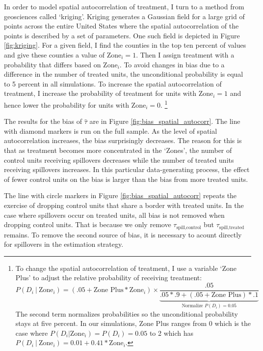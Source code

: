 \documentclass[11pt]{article}
\begin{document}
In order to model spatial autocorrelation of treatment, I turn to a method from geosciences called `kriging'. Kriging generates a Gaussian field for a large grid of points across the entire United States where the spatial autocorrelation of the points is described by a set of parameters. One such field is depicted in Figure \ref{fig:kriging}. For a given field, I find the counties in the top ten percent of values and give these counties a value of $\text{Zone}_i = 1$. Then I assign treatment with a probability that differs based on $\text{Zone}_i$. To avoid changes in bias due to a difference in the number of treated units, the unconditional probability is equal to 5 percent in all simulations. To increase the spatial autocorrelation of treatment, I increase the probability of treatment for units with $\text{Zone}_i = 1$ and hence lower the probability for units with $\text{Zone}_i = 0$. \footnote{
    To change the spatial autocorrelation of treatment, I use a variable `Zone Plus' to adjust the relative probability of receiving treatment: 
    \begin{equation}
        \label{eq:cond_prob}
        P(D_i \ \vert \ \text{Zone}_i) = (.05 + \text{Zone Plus} * \text{Zone}_i) \times \underbrace{\frac{.05}{.05 * .9 + (.05 + \text{Zone Plus}) * .1}}_{\text{Normalize } P(D_i) = 0.05}
    \end{equation}
    The second term normalizes probabilities so the unconditional probability stays at five percent. In our simulations, Zone Plus ranges from 0 which is the case where $P(D_i \vert \text{Zone}_i) = P(D_i) = 0.05$ to 2 which has $P(D_i \ \vert \ \text{Zone}_i) = 0.01 + 0.41 * \text{Zone}_i$.
}

The results for the bias of $\hat{\tau}$ are in Figure \ref{fig:bias_spatial_autocorr}. The line with diamond markers is run on the full sample. As the level of spatial autocorrelation increases, the bias surprisingly decreases. The reason for this is that as treatment becomes more concentrated in the `Zones', the number of control units receiving spillovers decreases while the number of treated units receiving spillovers increases. In this particular data-generating process, the effect of fewer control units on the bias is larger than the bias from more treated units. 

The line with circle markers in Figure \ref{fig:bias_spatial_autocorr} repeats the exercise of dropping control units that share a border with treated units. In the case where spillovers occur on treated units, all bias is not removed when dropping control units. That is because we only remove $\tau_{\text{spill,control}}$ but $\tau_{\text{spill,treated}}$ remains. To remove the second source of bias, it is necessary to acount directly for spillovers in the estimation strategy. 
\end{document}
